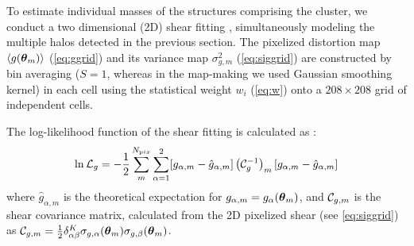 \documentclass[iop,twocolumn]{emulateapj}
\def\btheta{\mbox{\boldmath $\theta$}}
\begin{document}
To estimate individual masses of the structures comprising the cluster, we conduct a two dimensional (2D) shear fitting \citep{Okabe2011,Watanabe2011}, simultaneously modeling the multiple halos detected in the previous section. 
The pixelized distortion map $\langle g(\btheta_m)\rangle$ (\autoref{eq:ggrid}) and its variance map  $\sigma_{g,m}^2$ (\autoref{eq:siggrid}) are constructed by bin averaging ($S=1$, whereas in the map-making we used Gaussian smoothing kernel) in each cell using the statistical weight $w_i$ (\autoref{eq:w}) onto a $208\times208$ grid of independent cells. 

The log-likelihood function of the shear fitting is calculated as
\citep{Umetsu2015}:
\begin{equation}
 \ln \mathcal{L}_g 
= -\frac{1}{2}
 \sum_{m}^{N_{\mathrm pix}}
 \sum_{\alpha=1}^{2}
[g_{\alpha,m}-\hat{g}_{\alpha,m}]
\left({\cal C}^{-1}_g\right)_{m}%
 [g_{\alpha,m}-\hat{g}_{\alpha,m}]
\end{equation}
where  $\hat{g}_{\alpha,m}$
is the theoretical expectation for $g_{\alpha,m}=g_\alpha(\btheta_m)$,
and ${\cal C}_{g,m}$ is the shear covariance matrix, calculated from the
2D pixelized shear (see \autoref{eq:siggrid}) as ${\cal C}_{g,m} = \frac{1}{2} \delta^K_{\alpha\beta}\sigma_{g,\alpha}(\btheta_m)\sigma_{g,\beta}(\btheta_m)$.
\end{document}
